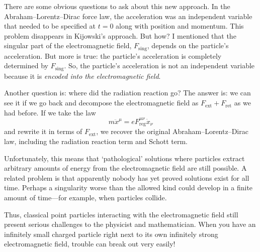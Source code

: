 \documentclass[12pt]{article}
\newcommand{\ret}{\mathrm{ret}}
\newcommand{\ext}{\mathrm{ext}}
\newcommand{\sing}{\mathrm{sing}}
\newcommand{\reg}{\mathrm{reg}}
\begin{document}
There are some obvious questions to ask about this new approach.  In the Abraham--Lorentz--Dirac force law, the acceleration was an independent variable that needed to be specified at $t = 0$ along with position and momentum.   This problem disappears in Kijowski's approach.  But how?  I mentioned that the singular part of the electromagnetic field, $F_\sing$, depends on the particle's acceleration.  But more is true: the particle's acceleration is completely determined by $F_\sing$.  So, the particle's acceleration is not an independent variable because it is \emph{encoded into the electromagnetic field}.

Another question is: where did the radiation reaction go?  The answer is: we can see it if we go back and decompose the electromagnetic field as $F_\ext + F_\ret$ as we had before.   If we take the law
\[    m \ddot{x}^\mu = e F_{\reg}^{\mu \nu} \dot{x}_\nu  \]
and rewrite it in terms of $F_\ext$, we recover the original Abraham--Lorentz--Dirac
law, including the radiation reaction term and Schott term.

Unfortunately, this means that `pathological' solutions where particles extract arbitrary amounts of energy from the electromagnetic field are still possible.   A related problem
is that apparently nobody has yet proved solutions exist for all time.  Perhaps a singularity worse than the allowed kind could develop in a finite amount of time---for example, when particles collide.  

Thus, classical point particles interacting with the electromagnetic field still present serious challenges to the physicist and mathematician. When you have an infinitely small charged particle right next to its own infinitely strong electromagnetic field, trouble can break out very easily!
\end{document}
